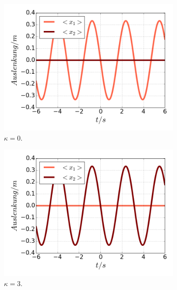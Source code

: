     \begin{figure}
      \begin{subfigure}[t]{0.5\textwidth}
        \centering
        \includegraphics[width=\textwidth]{plots/<x2>nl0.png}
        \caption{$\kappa=0$.}
        \label{fig:x2_null}
      \end{subfigure}
      \begin{subfigure}[t]{0.5\textwidth}
          \centering
          \includegraphics[width=\textwidth]{plots/<x1>nl0.png}
          \caption{$\kappa=3$.}
          \label{fig:x1_null}
      \end{subfigure}
      \begin{subfigure}[t]{0.5\textwidth}

\end{subfigure}
\end{figure}
